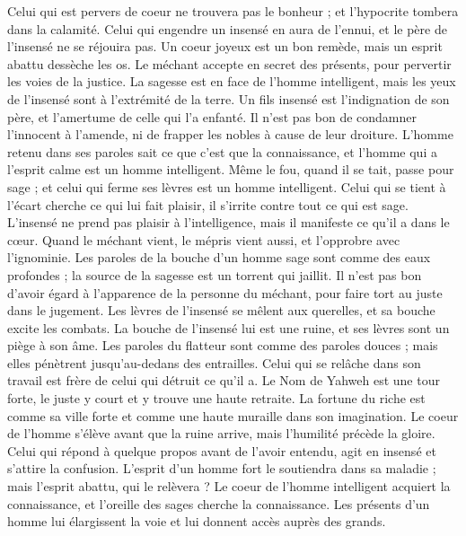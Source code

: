 \begin{multicols}{2}
Celui qui est pervers de coeur ne trouvera pas le bonheur ; et l'hypocrite tombera dans la calamité.
Celui qui engendre un insensé en aura de l'ennui, et le père de l’insensé ne se réjouira pas.
Un coeur joyeux est un bon remède, mais un esprit abattu dessèche les os.
Le méchant accepte en secret des présents, pour pervertir les voies de la justice.
La sagesse est en face de l'homme intelligent, mais les yeux de l’insensé sont à l’extrémité de la terre.
Un fils insensé est l'indignation de son père, et l'amertume de celle qui l'a enfanté.
Il n'est pas bon de condamner l'innocent à l'amende, ni de frapper les nobles à cause de leur droiture.
L'homme retenu dans ses paroles sait ce que c'est que la connaissance, et l'homme qui a l’esprit calme est un homme intelligent.
Même le fou, quand il se tait, passe pour sage ; et celui qui ferme ses lèvres est un homme intelligent.
\VerseOne{}Celui qui se tient à l’écart cherche ce qui lui fait plaisir, il s’irrite contre tout ce qui est sage.
L’insensé ne prend pas plaisir à l'intelligence, mais il manifeste ce qu’il a dans le cœur.
Quand le méchant vient, le mépris vient aussi, et l’opprobre avec l'ignominie.
Les paroles de la bouche d'un homme sage sont comme des eaux profondes ; la source de la sagesse est un torrent qui jaillit.
Il n'est pas bon d'avoir égard à l'apparence de la personne du méchant, pour faire tort au juste dans le jugement.
Les lèvres de l’insensé se mêlent aux querelles, et sa bouche excite les combats.
La bouche de l’insensé lui est une ruine, et ses lèvres sont un piège à son âme.
Les paroles du flatteur sont comme des paroles douces ; mais elles pénètrent jusqu'au-dedans des entrailles.
Celui qui se relâche dans son travail est frère de celui qui détruit ce qu'il a.
Le Nom de Yahweh est une tour forte, le juste y court et y trouve une haute retraite.
La fortune du riche est comme sa ville forte et comme une haute muraille dans son imagination.
Le coeur de l'homme s'élève avant que la ruine arrive, mais l'humilité précède la gloire.
Celui qui répond à quelque propos avant de l'avoir entendu, agit en insensé et s’attire la confusion.
L'esprit d'un homme fort le soutiendra dans sa maladie ; mais l'esprit abattu, qui le relèvera ?
Le coeur de l'homme intelligent acquiert la connaissance, et l'oreille des sages cherche la connaissance.
Les présents d'un homme lui élargissent la voie et lui donnent accès auprès des grands.

\end{multicols}
